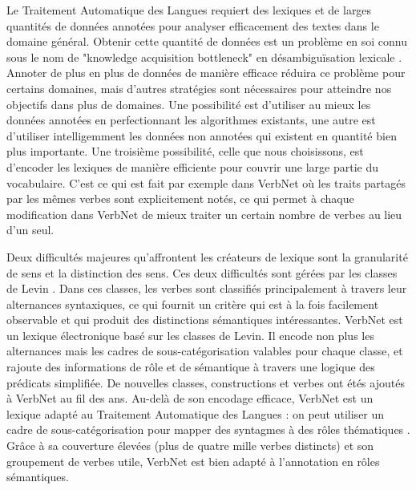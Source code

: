 Le Traitement Automatique des Langues requiert des lexiques et de larges
quantités de données annotées pour analyser efficacement des textes dans le
domaine général. Obtenir cette quantité de données est un problème en soi connu
sous le nom de "knowledge acquisition bottleneck" en désambiguïsation lexicale
\citep{gale1992using}. Annoter de plus en plus de données de manière efficace
réduira ce problème pour certains domaines, mais d'autres stratégies sont
nécessaires pour atteindre nos objectifs dans plus de domaines. Une possibilité
est d'utiliser au mieux les données annotées en perfectionnant les algorithmes
existants, une autre est d'utiliser intelligemment les données non annotées qui
existent en quantité bien plus importante. Une troisième possibilité, celle que
nous choisissons, est d'encoder les lexiques de manière efficiente pour couvrir
une large partie du vocabulaire. C'est ce qui est fait par exemple dans VerbNet
où les traits partagés par les mêmes verbes sont explicitement notés, ce qui
permet à chaque modification dans VerbNet de mieux traiter un certain nombre de
verbes au lieu d'un seul.

Deux difficultés majeures qu'affrontent les créateurs de lexique sont la
granularité de sens et la distinction des sens. Ces deux difficultés sont
gérées par les classes de Levin \citep{levin1993english}. Dans ces classes, les
verbes sont classifiés principalement à travers leur alternances syntaxiques,
ce qui fournit un critère qui est à la fois facilement observable et qui
produit des distinctions sémantiques intéressantes. VerbNet
\citep{kipperschuler2005verbnet} est un lexique électronique basé sur les
classes de Levin. Il encode non plus les alternances mais les cadres de
sous-catégorisation valables pour chaque classe, et rajoute des informations de
rôle et de sémantique à travers une logique des prédicats simplifiée. De
nouvelles classes, constructions et verbes ont étés ajoutés à VerbNet au fil
des ans. Au-delà de son encodage efficace, VerbNet est un lexique adapté au
Traitement Automatique des Langues : on peut utiliser un cadre de
sous-catégorisation pour mapper des syntagmes à des rôles thématiques
\citep{swier2005exploiting,pradet2013revisiting}. Grâce à sa couverture élevées
(plus de quatre mille verbes distincts) et son groupement de verbes utile,
VerbNet est bien adapté à l'annotation en rôles sémantiques.

